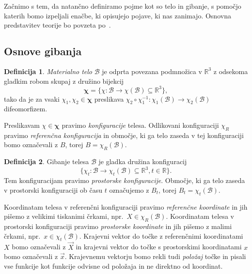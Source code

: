 \documentclass[12pt,a4paper,twoside]{article}
\theoremstyle{definition} %
\newtheorem{definicija}{Definicija}[section]
\theoremstyle{plain} %
\numberwithin{equation}{section}
\newcommand{\R}{\mathbb R}
\newcommand{\B}{\mathcal{B}}
\renewcommand{\b}{\boldsymbol}
\newcommand{\vX}{\vec{X}}
\newcommand{\vx}{\vec{x}}
\begin{document}
Začnimo s tem, da natančno definiramo pojme kot so telo in gibanje, s pomočjo katerih bomo izpeljali
enačbe, ki opisujejo pojave, ki nas zanimajo. Osnovna predstavitev teorije bo povzeta
po~\cite{slaughter2012linearized}.

\subsection{Osnove gibanja}

\begin{definicija}
  \emph{Materialno telo} $\B$ je odprta povezana podmnožica v $\R^3$ z odsekoma gladkim
  robom skupaj z družino bijekcij
  \begin{equation}
    \b\chi = \{\chi \colon\B\to\chi(\B) \subseteq \R^3\},
  \end{equation}
  tako da je za vsaki $\chi_1, \chi_2 \in \b\chi$ preslikava
  $\chi_2\circ\chi_1^{-1}\colon \chi_1(\B) \to \chi_2(\B)$
  difeomorfizem.

  Preslikavam $\chi \in \b\chi$ pravimo \emph{konfiguracije} telesa. Odlikovani
  konfiguraciji $\chi_R$ pravimo \emph{referenčna konfiguracija} in območje, ki
  ga telo zaseda v tej konfiguraciji bomo označevali z $B$, torej $B =
  \chi_R(\B)$.
\end{definicija}

\begin{definicija}
  \label{def:gibanje}
  Gibanje telesa $\B$ je gladka družina konfiguracij
  \begin{equation}
    \{\chi_t\colon \B \to\chi_t(\B) \subseteq \R^3, t \in \R\}.
  \end{equation}
  Tem konfiguracijam pravimo \emph{prostorske konfiguracije}. Območje, ki ga
  telo zaseda v prostorski konfiguraciji ob času $t$ označujemo z $B_t$, torej
  $B_t = \chi_t(\B)$.
\end{definicija}
Koordinatam telesa v referenčni konfiguraciji pravimo \emph{referenčne koordinate} in jih pišemo z
velikimi tiskanimi črkami, npr.~$X \in \chi_R(\B)$.  Koordinatam telesa v prostorski konfiguraciji
pravimo \emph{prostorske koordinate} in jih pišemo z malimi črkami, npr.~$x \in \chi_t(\B)$.
Krajevni vektor do točke z referenčnimi koordinatami $X$ bomo označevali z $\vX$ in krajevni vektor
do točke s prostorskimi koordinatami $x$ bomo označevali z $\vx$. Krajevnemu vektorju bomo rekli
tudi \emph{položaj} točke in pisali vse funkcije kot funkcije odvisne od položaja in ne direktno od
koordinat.
\end{document}
